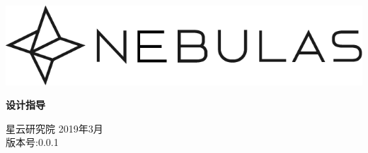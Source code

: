 \documentclass[12pt]{article}
\begin{document}
\pagestyle{empty}
\renewcommand{\contentsname}{目录}
\renewcommand{\abstractname}{摘要}
\renewcommand{\refname}{参考文献}
\renewcommand{\figurename}{图}
\renewcommand{\tablename}{表}
\renewcommand{\baselinestretch}{1.5}
\renewcommand{\appendixname}{附录}
\renewcommand{\proofname}{证明}


\begin{titlepage}
  \begin{center}
    \vspace*{5.5cm}
    \includegraphics[scale=0.5]{../common/Nebulas.png}
    \vspace{0.5cm}


   \textbf{\huge{设计指导}}

    \vspace{0.5cm}
    星云研究院
    \vfill
    2019年3月 \\
    版本号:0.0.1
    \textbf{}
  \end{center}

\end{titlepage}
\setcounter{page}{0}

\tableofcontents
\newpage
\setcounter{page}{1}
\pagestyle{fancy}
\vspace*{0.01cm}




\newpage

\end{document}
